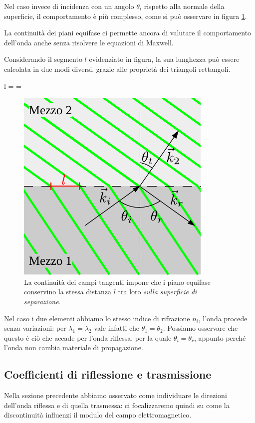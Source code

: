 	Nel caso invece di incidenza con un angolo $\theta_i$ rispetto alla normale della superficie, il comportamento è più complesso, come si può osservare in figura \ref{fig:incidenza_non_normale_isolanti}.

	La continuità dei piani equifase ci permette ancora di valutare il comportamento dell'onda anche senza risolvere le equazioni di Maxwell. 

	Considerando il segmento $l$ evidenziato in figura, la sua lunghezza può essere calcolata in due modi diversi, grazie alle proprietà dei triangoli rettangoli.

	\begin{esp}
		l =  = 
	\end{esp}

	\begin{figure}[ht] \label{fig:incidenza_non_normale_isolanti}
		\centering
		\includegraphics{img/incidenza_non_normale.pdf}
		\caption{La continuità dei campi tangenti impone che i piano equifase conservino la stessa distanza $l$ tra loro \emph{sulla superficie di separazione}.}
	\end{figure}

	Nel caso i due elementi abbiamo lo stesso indice di rifrazione $n_i$, l'onda procede senza variazioni: per $\lambda_1 = \lambda_2$ vale infatti che $\theta_1 = \theta_2$.
	Possiamo osservare che questo è ciò che accade per l'onda riflessa, per la quale $\theta_i = \theta_r$, appunto perché l'onda non cambia materiale di propagazione.

\subsection{Coefficienti di riflessione e trasmissione}
	Nella sezione precedente abbiamo osservato come individuare le direzioni dell'onda riflessa e di quella trasmessa: ci focalizzaremo quindi su come la discontinuità influenzi il modulo del campo elettromagnetico.
	
